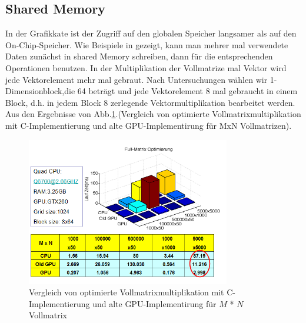 \subsection{Shared Memory}
In der Grafikkate ist der Zugriff auf den globalen Speicher langsamer als auf den On-Chip-Speicher.  Wie Beispiele in \cite{cudapg} gezeigt, kann man mehrer mal verwendete Daten zunächst in shared Memory schreiben, dann für die entsprechenden Operationen benutzen. In der Multiplikation der Vollmatrize mal Vektor wird jede Vektorelement mehr mal gebraut. Nach Untersuchungen wählen wir 1-Dimensionblock,die 64 beträgt und jede Vektorelement 8 mal gebraucht in einem Block, d.h. in jedem Block 8 zerlegende Vektormultiplikation bearbeitet werden. Aus den Ergebnisse von Abb.\ref{sharememory}.(Vergleich von optimierte Vollmatrixmultiplikation mit C-Implementierung und alte GPU-Implementirung für MxN Vollmatrizen).
\begin{figure}[htbp]
\includegraphics[width=3.5in]{../xby/pic/sharememory}
\caption{Vergleich von optimierte Vollmatrixmultiplikation mit C-Implementierung und alte GPU-Implementirung für $M$ * $N$ Vollmatrix}
\label{sharememory}
\end{figure}



